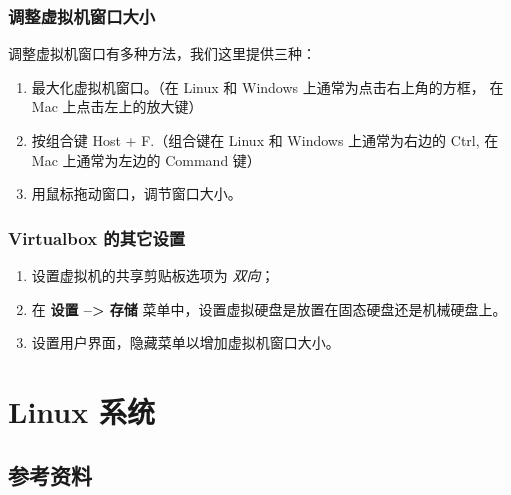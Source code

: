 \documentclass[
    11pt,
    cite=authoryear,
    device=normal,
    lang=cn,
    mode=simple,
    result=answer,
    toc=onecol,
]{elegantbook_sierxue}
\begin{document}
\subsubsection{调整虚拟机窗口大小}%
\label{ssub:vbox-set-window-size}

调整虚拟机窗口有多种方法，我们这里提供三种：
\begin{enumerate}
    \item 最大化虚拟机窗口。（在 Linux 和 Windows 上通常为点击右上角的方框，
        在 Mac 上点击左上的放大键）
    \item 按组合键 Host + F.（组合键在 Linux 和 Windows 上通常为右边的
        Ctrl, 在 Mac 上通常为左边的 Command 键）
    \item 用鼠标拖动窗口，调节窗口大小。
\end{enumerate}

\subsubsection{Virtualbox 的其它设置}%
\label{ssub:vbox-others}
\begin{enumerate}
    \item 设置虚拟机的共享剪贴板选项为 \emph{双向}；
    \item 在 \textbf{设置 --> 存储}
        菜单中，设置虚拟硬盘是放置在固态硬盘还是机械硬盘上。
    \item 设置用户界面，隐藏菜单以增加虚拟机窗口大小。
\end{enumerate}

\newpage
\section{Linux 系统}%
\label{sec:linux}

\subsection{参考资料}%
\label{sub:linux-refs}
\end{document}

